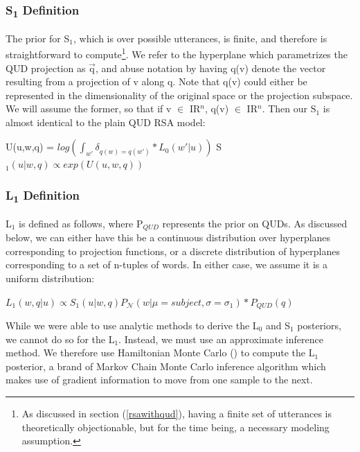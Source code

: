\documentclass[10pt,letterpaper,twocolumn]{article}
\begin{document}
\subsubsection{S\textsubscript{1} Definition}

The prior for S$_1$, which is over possible utterances, is finite, and therefore is straightforward to compute\footnote{As discussed in section (\ref{rsawithqud}), having a finite set of utterances is theoretically objectionable, but for the time being, a necessary modeling assumption.}. We refer to the hyperplane which parametrizes the QUD projection as $\overrightarrow{\text{q}}$, and abuse notation by having q(v) denote the vector resulting from a projection of v along q. Note that q(v) could either be represented in the dimensionality of the original space or the projection subspace. We will assume the former, so that if v $\in$ {\rm I\!R}$^n$, q(v) $\in$ {\rm I\!R}$^n$. Then our S$_1$ is almost identical to the plain QUD RSA model:

\begin{exe}
\ex U(u,w,q) = $log(\int_{w'} \delta_{q(w)=q(w')} * L_0(w'\vert u))$
\ex S$_1(u\vert w,q) \propto exp(U(u,w,q))$
\end{exe}




\subsubsection{L\textsubscript{1} Definition}

L$_1$ is defined as follows, where P$_{QUD}$ represents the prior on QUDs. As discussed below, we can either have this be a continuous distribution over hyperplanes corresponding to projection functions, or a discrete distribution of hyperplanes corresponding to a set of n-tuples of words. In either case, we assume it is a uniform distribution:
\begin{exe}
\ex $L_1(w,q\vert u) \propto S_1(u\vert w,q) P_{\mathcal{N}}(w\vert\mu=subject,\sigma=\sigma_1)*P_{QUD}(q)$
\end{exe}
While we were able to use analytic methods to derive the L$_0$ and S$_1$ posteriors, we cannot do so for the L$_1$. Instead, we must use an approximate inference method. We therefore use Hamiltonian Monte Carlo (\cite{neal2011mcmc}) to compute the L$_1$ posterior, a brand of Markov Chain Monte Carlo inference algorithm which makes use of gradient information to move from one sample to the next.
\end{document}

